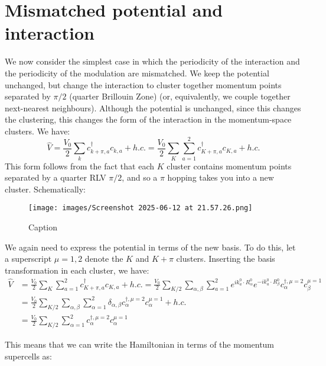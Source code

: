 \documentclass[12pt]{article}
\numberwithin{equation}{section}
\begin{document}
\section{Mismatched potential and interaction}
We now consider the simplest case in which the periodicity of the interaction and the periodicity of the modulation are mismatched. We keep the potential unchanged, but change the interaction to cluster together momentum points separated by $\pi/2$ (quarter Brillouin Zone) (or, equivalently, we couple together next-nearest neighbours). Although the potential is unchanged, since this changes the clustering, this changes the form of the interaction in the momentum-space clusters. We have:
\begin{equation}
    \hat{V}=\frac{V_0}{2}\sum_{k}c^\dagger_{k+\pi,a}c_{k,a}+h.c.
    =\frac{V_0}{2}\sum_{K}\sum_{a=1}^{2}c^\dagger_{K+\pi,a}c_{K,a}+h.c.
\end{equation}
This form follows from the fact that each $K$ cluster contains momentum points separated by a quarter RLV $\pi/2$, and so a $\pi$ hopping takes you into a new cluster. Schematically:
\begin{figure}
    \centering
    \texttt{[image: images/Screenshot 2025-06-12 at 21.57.26.png]}
    \caption{Caption}
    \label{fig:enter-label}
\end{figure}
We again need to express the potential in terms of the new basis. To do this, let a superscript $\mu=1,2$ denote the $K$ and $K+\pi$ clusters. Inserting the basis transformation in each cluster, we have:
\begin{align}
    \hat{V}&=\frac{V_0}{2}\sum_{K}\sum_{a=1}^{2}c^\dagger_{K+\pi,a}c_{K,a}+h.c.
    =\frac{V_0}{2}\sum_{K/2}\sum_{\alpha,\beta}\sum_{a=1}^{2}
    e^{ik^0_a\cdot R^0_{\alpha}}e^{-ik^0_a\cdot R^0_{\beta}}c^{\dagger,\mu=2}_{\alpha}c^{\mu=1}_{\beta}\\
    &=\frac{V_0}{2}\sum_{K/2}\sum_{\alpha,\beta}\sum_{\alpha=1}^{2}
\delta_{\alpha,\beta}c^{\dagger,\mu=2}_{\alpha}c^{\mu=1}_{\alpha}+h.c.\\
&=\frac{V_0}{2}\sum_{K/2}\sum_{\alpha=1}^{2}
c^{\dagger,\mu=2}_{\alpha}c^{\mu=1}_{\alpha}
\end{align}

This means that we can write the Hamiltonian in terms of the momentum supercells as:
\end{document}
